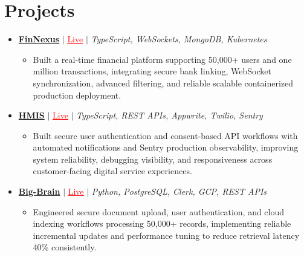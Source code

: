 \documentclass[letterpaper,10pt]{article}
\newcommand{\resumeItem}[1]{\item\small{{#1 \vspace{-2pt}}}}
\newcommand{\resumeProjectHeading}[1]{\item \small #1 \vspace{-2pt}}
\newcommand{\resumeProjectLink}[2]{\href{#1}{\textcolor{red}{\underline{#2}}}}
\newcommand{\resumeSubHeadingListStart}{\begin{itemize}[leftmargin=0.0in,label={}]}
\newcommand{\resumeSubHeadingListEnd}{\end{itemize}}
\newcommand{\resumeProjItemListStart}{\begin{itemize}[leftmargin=0.15in,label=\textbullet,itemsep=0pt,topsep=0pt,parsep=0pt,partopsep=0pt]}
\newcommand{\resumeProjItemListEnd}{\end{itemize}\vspace{1pt}}
\begin{document}
\section{Projects}
\resumeSubHeadingListStart
  \resumeProjectHeading{\href{https://fin-nexus.vercel.app/}{\textbf{FinNexus}} $|$ \resumeProjectLink{https://fin-nexus.vercel.app/}{Live} $|$ \emph{TypeScript, WebSockets, MongoDB, Kubernetes}}
  \resumeProjItemListStart
    \resumeItem{Built a real-time financial platform supporting 50,000+ users and one million transactions, integrating secure bank linking, WebSocket synchronization, advanced filtering, and reliable scalable containerized production deployment.}
  \resumeProjItemListEnd
  \resumeProjectHeading{\href{https://hims-rouge.vercel.app/}{\textbf{HMIS}} $|$ \resumeProjectLink{https://hims-rouge.vercel.app/}{Live} $|$ \emph{TypeScript, REST APIs, Appwrite, Twilio, Sentry}}
  \resumeProjItemListStart
    \resumeItem{Built secure user authentication and consent-based API workflows with automated notifications and Sentry production observability, improving system reliability, debugging visibility, and responsiveness across customer-facing digital service experiences.}
  \resumeProjItemListEnd
  \resumeProjectHeading{\href{https://big-brain-pied.vercel.app/}{\textbf{Big-Brain}} $|$ \resumeProjectLink{https://big-brain-pied.vercel.app/}{Live} $|$ \emph{Python, PostgreSQL, Clerk, GCP, REST APIs}}
  \resumeProjItemListStart
    \resumeItem{Engineered secure document upload, user authentication, and cloud indexing workflows processing 50,000+ records, implementing reliable incremental updates and performance tuning to reduce retrieval latency 40\% consistently.}
  \resumeProjItemListEnd
\resumeSubHeadingListEnd
\end{document}
